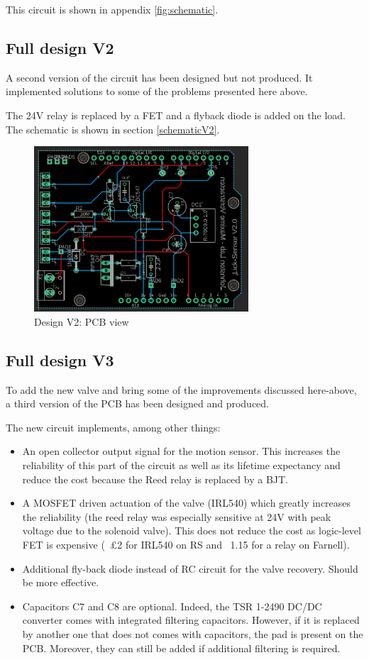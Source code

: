 \documentclass[a4paper]{article}
\begin{document}
This circuit is shown in appendix \ref{fig:schematic}.

\newpage
\subsection{Full design V2}
A second version of the circuit has been designed but not produced. It implemented solutions to some of the problems presented here above.

The 24V relay is replaced by a FET and a flyback diode is added on the load.
The schematic is shown in section \ref{schematicV2}.

\begin{figure}[h!t!b!]
    \centering
    \includegraphics[width = 8cm]{images/schematicV2.PNG}
    \caption{Design V2: PCB view}
    \label{fig:PCBV2}
\end{figure}

\subsection{Full design V3}
\label{designV3}
To add the new valve and bring some of the improvements discussed here-above, a third version of the PCB has been designed and produced.

The new circuit implements, among other things:
\begin{itemize}
    \item An open collector output signal for the motion sensor. This increases the reliability of this part of the circuit as well as its lifetime expectancy and reduce the cost because the Reed relay is replaced by a BJT.
    \item A MOSFET driven actuation of the valve (IRL540) which greatly increases the reliability (the reed relay was especially sensitive at 24V with peak voltage due to the solenoid valve). This does not reduce the cost as logic-level FET is expensive (~£2 for IRL540 on RS and ~1.15 for a relay on Farnell).
    \item Additional fly-back diode instead of RC circuit for the valve recovery. Should be more effective.
    \item Capacitors C7 and C8 are optional. Indeed, the TSR 1-2490 DC/DC converter comes with integrated filtering capacitors. However, if it is replaced by another one that does not comes with capacitors, the pad is present on the PCB. Moreover, they can still be added if additional filtering is required.
\end{itemize}
\end{document}
